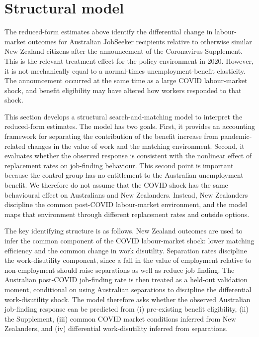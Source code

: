 \clearpage

\section{Structural model}\label{sec:structure}

The reduced-form estimates above identify the differential change in labour-market outcomes for Australian JobSeeker recipients relative to otherwise similar New Zealand citizens after the announcement of the Coronavirus Supplement. This is the relevant treatment effect for the policy environment in 2020. However, it is not mechanically equal to a normal-times unemployment-benefit elasticity. The announcement occurred at the same time as a large COVID labour-market shock, and benefit eligibility may have altered how workers responded to that shock.

This section develops a structural search-and-matching model to interpret the reduced-form estimates. The model has two goals. First, it provides an accounting framework for separating the contribution of the benefit increase from pandemic-related changes in the value of work and the matching environment. Second, it evaluates whether the observed response is consistent with the nonlinear effect of replacement rates on job-finding behaviour. This second point is important because the control group has no entitlement to the Australian unemployment benefit. We therefore do not assume that the COVID shock has the same behavioural effect on Australians and New Zealanders. Instead, New Zealanders discipline the common post-COVID labour-market environment, and the model maps that environment through different replacement rates and outside options.

The key identifying structure is as follows. New Zealand outcomes are used to infer the common component of the COVID labour-market shock: lower matching efficiency and the common change in work disutility. Separation rates discipline the work-disutility component, since a fall in the value of employment relative to non-employment should raise separations as well as reduce job finding. The Australian post-COVID job-finding rate is then treated as a held-out validation moment, conditional on using Australian separations to discipline the differential work-disutility shock. The model therefore asks whether the observed Australian job-finding response can be predicted from (i) pre-existing benefit eligibility, (ii) the Supplement, (iii) common COVID market conditions inferred from New Zealanders, and (iv) differential work-disutility inferred from separations.

